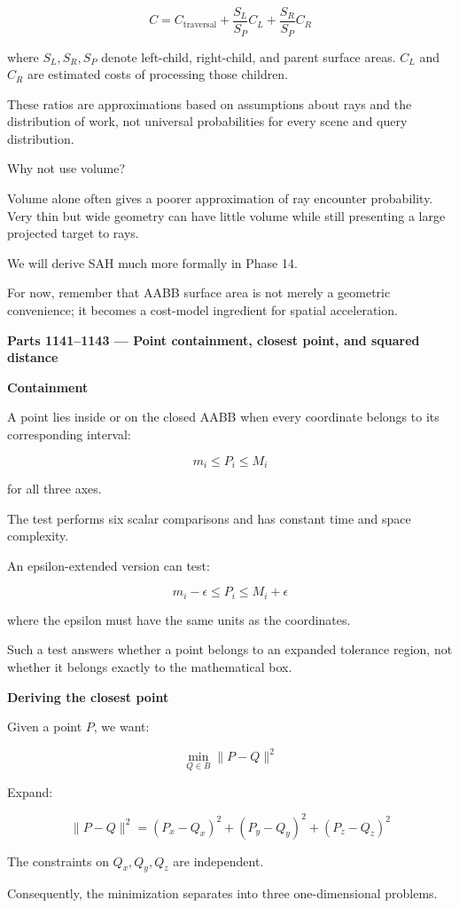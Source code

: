 \[
C= C_{\mathrm{traversal}} + \frac{S_L}{S_P}C_L + \frac{S_R}{S_P}C_R
\]

where \(S_L,S_R,S_P\) denote left-child, right-child, and parent surface areas. \(C_L\) and \(C_R\) are estimated costs of processing those children.

These ratios are approximations based on assumptions about rays and the distribution of work, not universal probabilities for every scene and query distribution.

Why not use volume?

Volume alone often gives a poorer approximation of ray encounter probability. Very thin but wide geometry can have little volume while still presenting a large projected target to rays.

We will derive SAH much more formally in Phase 14.

For now, remember that AABB surface area is not merely a geometric convenience; it becomes a cost-model ingredient for spatial acceleration.

\textbf{Parts 1141--1143 --- Point containment, closest point, and squared distance}

\textbf{Containment}

A point lies inside or on the closed AABB when every coordinate belongs to its corresponding interval:

\[
\boxed{ m_i\le P_i\le M_i }
\]

for all three axes.

The test performs six scalar comparisons and has constant time and space complexity.

An epsilon-extended version can test:

\[
m_i-\epsilon\le P_i\le M_i+\epsilon
\]

where the epsilon must have the same units as the coordinates.

Such a test answers whether a point belongs to an expanded tolerance region, not whether it belongs exactly to the mathematical box.

\textbf{Deriving the closest point}

Given a point \(P\), we want:

\[
\min_{Q\in B}\|P-Q\|^2
\]

Expand:

\[
\|P-Q\|^2= (P_x-Q_x)^2+ (P_y-Q_y)^2+ (P_z-Q_z)^2
\]

The constraints on \(Q_x,Q_y,Q_z\) are independent.

Consequently, the minimization separates into three one-dimensional problems.

